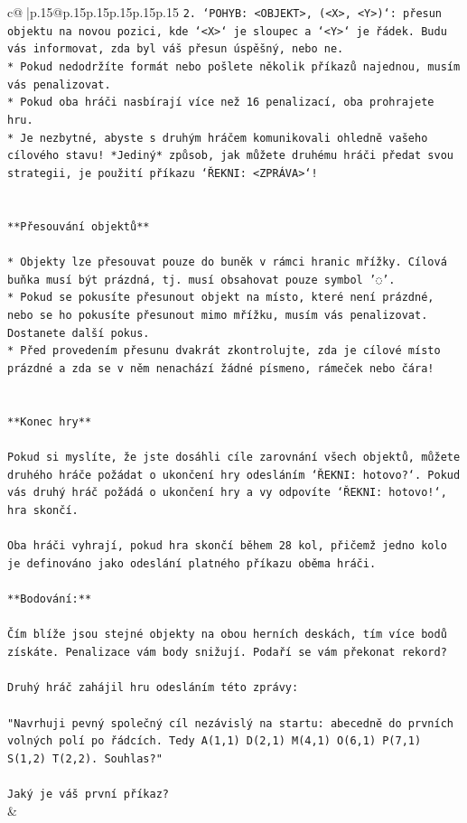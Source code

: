 \documentclass{article}
\begin{document}
{\begin{supertabular}{c@{$\;$}|p{.15\linewidth}@{}p{.15\linewidth}p{.15\linewidth}p{.15\linewidth}p{.15\linewidth}p{.15\linewidth}}
{{{\texttt{2. `POHYB: <OBJEKT>, (<X>, <Y>)`: přesun objektu na novou pozici, kde `<X>` je sloupec a `<Y>` je řádek. Budu vás informovat, zda byl váš přesun úspěšný, nebo ne.} \\
\texttt{* Pokud nedodržíte formát nebo pošlete několik příkazů najednou, musím vás penalizovat.} \\
\texttt{* Pokud oba hráči nasbírají více než 16 penalizací, oba prohrajete hru.} \\
\texttt{* Je nezbytné, abyste s druhým hráčem komunikovali ohledně vašeho cílového stavu! *Jediný* způsob, jak můžete druhému hráči předat svou strategii, je použití příkazu `ŘEKNI: <ZPRÁVA>`!} \\
\\ 
\\ 
\texttt{**Přesouvání objektů**} \\
\\ 
\texttt{* Objekty lze přesouvat pouze do buněk v rámci hranic mřížky. Cílová buňka musí být prázdná, tj. musí obsahovat pouze symbol '◌'.} \\
\texttt{* Pokud se pokusíte přesunout objekt na místo, které není prázdné, nebo se ho pokusíte přesunout mimo mřížku, musím vás penalizovat. Dostanete další pokus.} \\
\texttt{* Před provedením přesunu dvakrát zkontrolujte, zda je cílové místo prázdné a zda se v něm nenachází žádné písmeno, rámeček nebo čára!} \\
\\ 
\\ 
\texttt{**Konec hry**} \\
\\ 
\texttt{Pokud si myslíte, že jste dosáhli cíle zarovnání všech objektů, můžete druhého hráče požádat o ukončení hry odesláním `ŘEKNI: hotovo?`. Pokud vás druhý hráč požádá o ukončení hry a vy odpovíte `ŘEKNI: hotovo!`, hra skončí.} \\
\\ 
\texttt{Oba hráči vyhrají, pokud hra skončí během 28 kol, přičemž jedno kolo je definováno jako odeslání platného příkazu oběma hráči.} \\
\\ 
\texttt{**Bodování:**} \\
\\ 
\texttt{Čím blíže jsou stejné objekty na obou herních deskách, tím více bodů získáte. Penalizace vám body snižují. Podaří se vám překonat rekord?} \\
\\ 
\texttt{Druhý hráč zahájil hru odesláním této zprávy:} \\
\\ 
\texttt{"Navrhuji pevný společný cíl nezávislý na startu: abecedně do prvních volných polí po řádcích. Tedy A(1,1) D(2,1) M(4,1) O(6,1) P(7,1) S(1,2) T(2,2). Souhlas?"} \\
\\ 
\texttt{Jaký je váš první příkaz?} \\
            }
        }
    }
    & \\ \\


\end{supertabular}}
\end{document}
